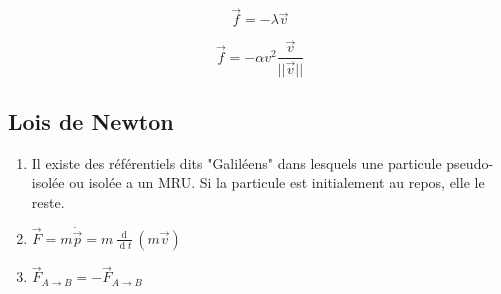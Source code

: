 \documentclass{article}
\renewcommand{\d}{\operatorname{d}}
\renewcommand{\vec}{\overrightarrow}
\begin{document}
\[
	\vec{f} = -\lambda \vec{v}
\] 

\[
	\vec{f} = -\alpha v^2 \frac{\vec{v}}{||\vec{v}||}
\] 
\subsection{Lois de Newton}
\begin{enumerate}
	\item Il existe des référentiels dits "Galiléens" dans lesquels une particule pseudo-isolée ou isolée a un MRU. Si la particule est initialement au repos, elle le reste.
	\item $\vec{F} = m\dot{\vec{p}} = m \frac{\d}{\d t}(m \vec{v})$ 
	\item $\vec{F}_{A\to B} = -\vec{F}_{A\to B}$
\end{enumerate}
\end{document}
